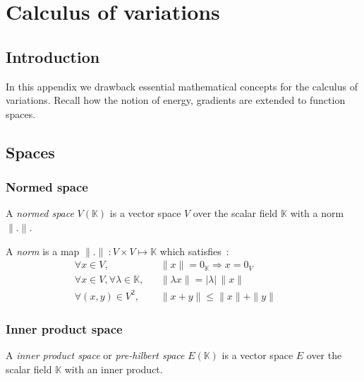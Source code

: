 
\chapter{Calculus of variations}

\section{Introduction}
In this appendix we drawback essential mathematical concepts for the calculus of variations.
Recall how the notion of energy, gradients are extended to function spaces.

\cite{Abraham2002}

\section{Spaces}

\subsection{Normed space}
A \emph{normed space} $V(\mathbb{K})$ is a vector space $V$ over the scalar field $\mathbb{K}$ with a norm $\|.\|$.

A \emph{norm} is a map $\| . \|~: V \times V \longmapsto \mathbb{K}$ which satisfies~:
\begin{subequations}
\begin{align}
	&\forall x \in V, 							&& \|x\| = 0_\mathbb{K} \Rightarrow x = 0_V&&&\\
	&\forall x \in V, \forall \lambda \in \mathbb{K}, 	&& \|\lambda x\| = |\lambda| \,\|x\|&&&\\
	&\forall (x,y) \in V^2, 						&& \|x + y\| \leqslant \|x\| + \|y\|&&&
\end{align}
\end{subequations}


\subsection{Inner product space}
A \emph{inner product space} or \emph{pre-hilbert space} $E(\mathbb{K})$ is a vector space $E$ over the scalar field $\mathbb{K}$ with an inner product.

